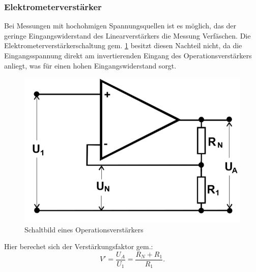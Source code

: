 \subsubsection{Elektrometerverst{\"a}rker}
Bei Messungen mit hochohmigen Spannungsquellen ist es möglich, das der geringe Eingangswiderstand des Linearverstärkers die Messung Verfäschen. Die
Elektrometerverstärkerschaltung gem. \ref{abb:elektro} besitzt diesen Nachteil nicht, da die Eingangsspannung direkt am invertierenden Eingang des Operationsverstärkers anliegt, was für einen hohen Eingangswiderstand
sorgt.
\begin{figure}
 	\centering
 	\includegraphics[width=\textwidth]{img/elec.png}
 	\caption{Schaltbild eines Operationsverstärkers}
 	\label{abb:elektro}
\end{figure}
Hier berechet sich der Verstärkungsfaktor gem.:
\begin{equation}
V' = \frac{U_A}{U_1}=\frac{R_N + R_1}{R_1}.
\end{equation}


